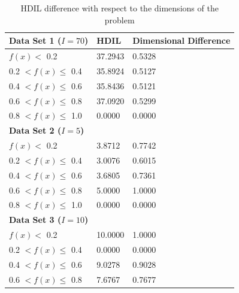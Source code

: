 \documentclass[journal,comsoc]{IEEEtran}
\begin{document}
 \begin{table}[H]
\centering
\caption{HDIL difference with respect to the dimensions of the problem}
\label{dim}
\begin{tabular}{lll}
\textbf{Data Set 1 ($I = 70$)} & HDIL & Dimensional Difference \\ \hline
\multicolumn{1}{|l|}{$ f(x) < $ 0.2} & \multicolumn{1}{l|}{37.2943} & \multicolumn{1}{l|}{0.5328} \\ \hline
\multicolumn{1}{|l|}{0.2 $ < f(x) \leq $ 0.4} & \multicolumn{1}{l|}{35.8924} & \multicolumn{1}{l|}{0.5127} \\ \hline
\multicolumn{1}{|l|}{0.4 $ < f(x) \leq $ 0.6} & \multicolumn{1}{l|}{35.8436} & \multicolumn{1}{l|}{0.5121} \\ \hline
\multicolumn{1}{|l|}{0.6 $ < f(x) \leq $ 0.8} & \multicolumn{1}{l|}{37.0920} & \multicolumn{1}{l|}{0.5299} \\ \hline
\multicolumn{1}{|l|}{0.8 $ < f(x) \leq $ 1.0} & \multicolumn{1}{l|}{0.0000} & \multicolumn{1}{l|}{0.0000} \\ \hline
\textbf{Data Set 2 ($I = 5$)} & \\ \hline
\multicolumn{1}{|l|}{$ f(x) < $ 0.2} & \multicolumn{1}{l|}{3.8712} & \multicolumn{1}{l|}{0.7742} \\ \hline
\multicolumn{1}{|l|}{0.2 $ < f(x) \leq $ 0.4} & \multicolumn{1}{l|}{3.0076} & \multicolumn{1}{l|}{0.6015} \\ \hline
\multicolumn{1}{|l|}{0.4 $ < f(x) \leq $ 0.6} & \multicolumn{1}{l|}{3.6805} & \multicolumn{1}{l|}{0.7361} \\ \hline
\multicolumn{1}{|l|}{0.6 $ < f(x) \leq $ 0.8} & \multicolumn{1}{l|}{5.0000} & \multicolumn{1}{l|}{1.0000} \\ \hline
\multicolumn{1}{|l|}{0.8 $ < f(x) \leq $ 1.0} & \multicolumn{1}{l|}{0.0000} & \multicolumn{1}{l|}{0.0000} \\ \hline
\textbf{Data Set 3 ($I = 10$)} &   \\ \hline
\multicolumn{1}{|l|}{$ f(x) < $ 0.2} & \multicolumn{1}{l|}{10.0000} & \multicolumn{1}{l|}{1.0000} \\ \hline
\multicolumn{1}{|l|}{0.2 $ < f(x) \leq $ 0.4} & \multicolumn{1}{l|}{0.0000} & \multicolumn{1}{l|}{0.0000} \\ \hline
\multicolumn{1}{|l|}{0.4 $ < f(x) \leq $ 0.6} & \multicolumn{1}{l|}{9.0278} & \multicolumn{1}{l|}{0.9028} \\ \hline
\multicolumn{1}{|l|}{0.6 $ < f(x) \leq $ 0.8} & \multicolumn{1}{l|}{7.6767} & \multicolumn{1}{l|}{0.7677} \\ \hline

\end{tabular}
\end{table}
\end{document}
